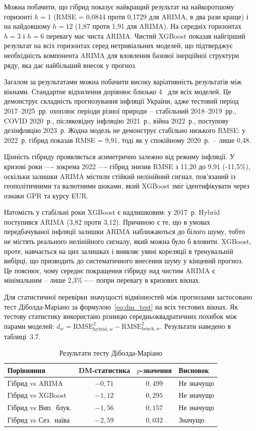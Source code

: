 \documentclass{bachelor_thesis}
\begin{document}
Можна побачити, що гібрид показує найкращий результат на найкоротшому горизонті $h=1$ (RMSE = 0{,}0844 проти 0{,}1729 для ARIMA, в два рази краще) і на найдовшому $h=12$ (1{,}87 проти 1{,}91 для ARIMA). На середніх горизонтах $h=3$ і $h=6$ перевагу має чиста ARIMA. Чистий XGBoost показав найгірший результат на всіх горизонтах серед нетривіальних моделей, що підтверджує необхідність компонента ARIMA для вловлення базової інерційної структури ряду, яка дає найбільший внесок у прогноз.

Загалом за результатами можна побачити високу варіативність результатів між вікнами. Стандартне відхилення дорівнює близько 4~ для всіх моделей. Це демонструє складність прогнозування інфляції України, адже тестовий період 2017--2025~рр. охоплює періоди різної природи~-- стабільний 2018--2019~рр., COVID 2020~р., післяковідну інфляцію 2021~р., війна 2022~р., поступову дезінфляцію 2023~р. Жодна модель не демонструє стабільно низького RMSE: у 2022~р. гібрид показав RMSE = 9{,}91, тоді як у спокійному 2020~р.~-- лише 0{,}48.

Цінність гібриду проявляється асиметрично залежно від режиму інфляції.
У кризові роки —- зокрема 2022 —- гібрид знизив RMSE з 11{,}20 до 9{,}91
(-11{,}5\%), оскільки залишки ARIMA містили стійкий нелінійний сигнал,
пов'язаний із геополітичними та валютними шоками, який XGBoost зміг
ідентифікувати через ознаки GPR та курсу EUR.

Натомість у стабільні роки XGBoost є надлишковим:
у 2017~р. Hybrid поступився ARIMA (3{,}82 проти 3{,}12). Причиною є те, що в умовах передбачуваної
інфляції залишки ARIMA наближаються до білого шуму, тобто не містять
реального нелінійного сигналу, який можна було б вловити. XGBoost, проте,
навчається на цих залишках і виявляє уявні кореляції в тренувальній вибірці, що призводить до систематичного внесення шуму у кінцевий прогноз. Це пояснює, чому середнє покращення гібриду над чистим ARIMA є мінімальним -- лише 2{,}3\% -— попри перевагу в кризових вікнах.


Для статистичної перевірки значущості відмінностей між прогнозами застосовано тест Діболда-Маріано за формулою~\eqref{eq:dm_test} на всіх тестових вікнах. Як тестову статистику використано різницю середньоквадратичних похибок між парами моделей: $d_w = \text{RMSE}^2_{\text{hybrid},w} - \text{RMSE}^2_{\text{bench},w}$. Результати наведено в таблиці~3.7.

\begin{table}[h!]
\centering
\begin{tabular}{|l|c|c|l|}
\hline
\textbf{Порівняння} & \textbf{DM-статистика} & \textbf{$p$-значення} & \textbf{Висновок} \\
\hline
Гібрид vs ARIMA        & $-0{,}71$ & $0{,}499$  & Не значущо \\
Гібрид vs XGBoost      & $-1{,}12$ & $0{,}295$  & Не значущо \\
Гібрид vs Вип.\ блук.  & $-1{,}56$ & $0{,}157$  & Не значущо \\
Гібрид vs Сез.\ наїва  & $-2{,}59$ & $0{,}032$  & Значущо \\
\hline
\end{tabular}
\caption{Результати тесту Діболда-Маріано}
\label{tab:dm_test}
\end{table}
\end{document}
